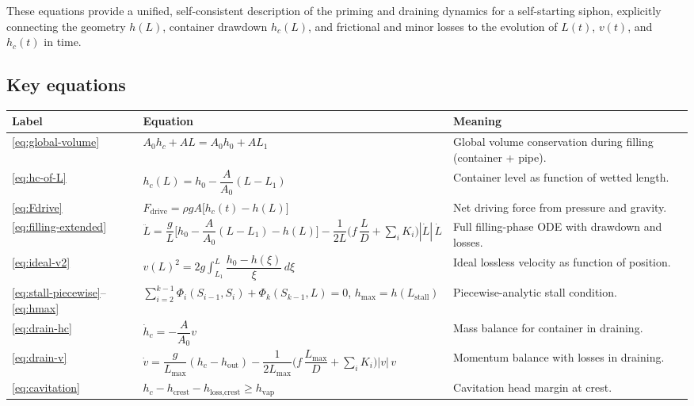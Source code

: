 \documentclass[11pt]{article}
\begin{document}
These equations provide a unified, self-consistent description of the priming and draining
dynamics for a self-starting siphon, explicitly connecting the geometry $h(L)$, container
drawdown $h_c(L)$, and frictional and minor losses to the evolution of $L(t)$, $v(t)$, and
$h_c(t)$ in time.

\subsection*{Key equations}
\renewcommand{\arraystretch}{1.3}
\small
\begin{tabular}{lp{}p{}}
  Label & Equation & Meaning \\ \hline
  \eqref{eq:global-volume} & $A_0 h_c + A L = A_0 h_0 + A L_1$
    & Global volume conservation during filling (container + pipe). \\[0.3em]
  \eqref{eq:hc-of-L} & $h_c(L) = h_0 - \dfrac{A}{A_0}(L-L_1)$
    & Container level as function of wetted length. \\[0.3em]
  \eqref{eq:Fdrive} & $F_{\text{drive}} = \rho g A\bigl[h_c(t)-h(L)\bigr]$
    & Net driving force from pressure and gravity. \\[0.3em]
  \eqref{eq:filling-extended} & $\ddot L = \dfrac{g}{L}\Big[h_0 - \dfrac{A}{A_0}(L-L_1) - h(L)\Big] - \dfrac{1}{2L}\Big(f\,\dfrac{L}{D}+\sum_i K_i\Big)|\dot L|\,\dot L$
    & Full filling-phase ODE with drawdown and losses. \\[0.3em]
  \eqref{eq:ideal-v2} & $v(L)^2 = 2g\displaystyle\int_{L_1}^{L} \dfrac{h_0-h(\xi)}{\xi}\,d\xi$
    & Ideal lossless velocity as function of position. \\[0.3em]
  \eqref{eq:stall-piecewise}--\eqref{eq:hmax}
    & $\sum_{i=2}^{k-1}\Phi_i(S_{i-1},S_i)+\Phi_k(S_{k-1},L)=0$, $h_{\max}=h(L_{\text{stall}})$
    & Piecewise-analytic stall condition. \\[0.3em]
  \eqref{eq:drain-hc} & $\dot h_c = -\dfrac{A}{A_0}v$
    & Mass balance for container in draining. \\[0.3em]
  \eqref{eq:drain-v} & $\dot v = \dfrac{g}{L_{\max}}(h_c-h_{\text{out}}) - \dfrac{1}{2L_{\max}}\Big(f\,\dfrac{L_{\max}}{D}+\sum_i K_i\Big)|v|\,v$
    & Momentum balance with losses in draining. \\[0.3em]
  \eqref{eq:cavitation} & $h_c-h_{\text{crest}}-h_{\text{loss,crest}}\ge h_{\mathrm{vap}}$
    & Cavitation head margin at crest. \\
\end{tabular}
\normalsize
\end{document}
